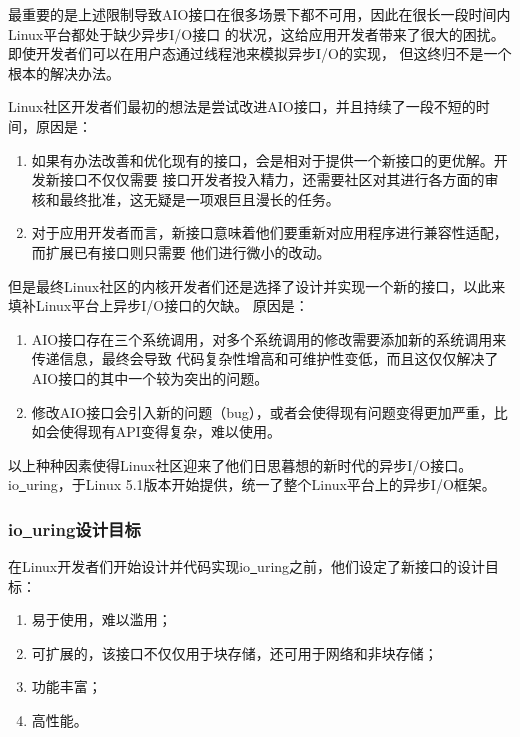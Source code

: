 \documentclass[supercite]{HustGraduPaper}
\theoremstyle{definition}
\begin{document}
最重要的是上述限制导致AIO接口在很多场景下都不可用，因此在很长一段时间内Linux平台都处于缺少异步I/O接口
的状况，这给应用开发者带来了很大的困扰。即使开发者们可以在用户态通过线程池来模拟异步I/O的实现，
但这终归不是一个根本的解决办法。\par

Linux社区开发者们最初的想法是尝试改进AIO接口，并且持续了一段不短的时间，原因是：

\begin{enumerate}
  \item 如果有办法改善和优化现有的接口，会是相对于提供一个新接口的更优解。开发新接口不仅仅需要
    接口开发者投入精力，还需要社区对其进行各方面的审核和最终批准，这无疑是一项艰巨且漫长的任务。
  \item 对于应用开发者而言，新接口意味着他们要重新对应用程序进行兼容性适配，而扩展已有接口则只需要
    他们进行微小的改动。
\end{enumerate}

但是最终Linux社区的内核开发者们还是选择了设计并实现一个新的接口，以此来填补Linux平台上异步I/O接口的欠缺。
原因是：

\begin{enumerate}
  \item AIO接口存在三个系统调用，对多个系统调用的修改需要添加新的系统调用来传递信息，最终会导致
    代码复杂性增高和可维护性变低，而且这仅仅解决了AIO接口的其中一个较为突出的问题。
  \item 修改AIO接口会引入新的问题（bug），或者会使得现有问题变得更加严重，比如会使得现有API变得复杂，难以使用。
\end{enumerate}

以上种种因素使得Linux社区迎来了他们日思暮想的新时代的异步I/O接口。
io\underline{~}uring，于Linux 5.1版本开始提供，统一了整个Linux平台上的异步I/O框架。\par

\subsubsection{io\underline{~}uring设计目标}
在Linux开发者们开始设计并代码实现io\underline{~}uring之前，他们设定了新接口的设计目标：

\begin{enumerate}
  \item 易于使用，难以滥用；
  \item 可扩展的，该接口不仅仅用于块存储，还可用于网络和非块存储；
  \item 功能丰富；
  \item 高性能。
\end{enumerate}
\end{document}
